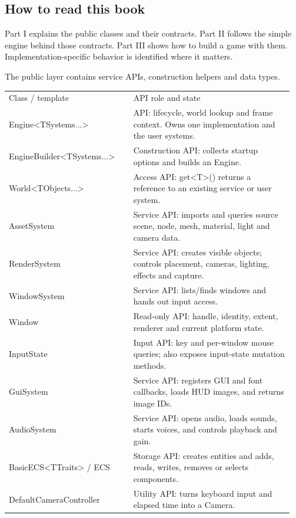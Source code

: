 \documentclass[11pt,a4paper]{article}
\begin{document}
\subsection*{How to read this book}
Part I explains the public classes and their contracts. Part II follows the simple engine behind those contracts. Part III shows how to build a game with them. Implementation-specific behavior is identified where it matters.

\label{core-5}
The public layer contains service APIs, construction helpers and data types.

{\small
\begin{longtable}{@{}p{0.42\linewidth}p{0.54\linewidth}@{}}
Class / template & API role and state \\
Engine<TSystems...> & API: lifecycle, world lookup and frame context. Owns one implementation and the user systems. \\
EngineBuilder<TSystems...> & Construction API: collects startup options and builds an Engine. \\
World<TObjects...> & Access API: get<T>() returns a reference to an existing service or user system. \\
AssetSystem & Service API: imports and queries source scene, node, mesh, material, light and camera data. \\
RenderSystem & Service API: creates visible objects; controls placement, cameras, lighting, effects and capture. \\
WindowSystem & Service API: lists/finds windows and hands out input access. \\
Window & Read-only API: handle, identity, extent, renderer and current platform state. \\
InputState & Input API: key and per-window mouse queries; also exposes input-state mutation methods. \\
GuiSystem & Service API: registers GUI and font callbacks, loads HUD images, and returns image IDs. \\
AudioSystem & Service API: opens audio, loads sounds, starts voices, and controls playback and gain. \\
BasicECS<TTraits> / ECS & Storage API: creates entities and adds, reads, writes, removes or selects components. \\
DefaultCameraController & Utility API: turns keyboard input and elapsed time into a Camera. \\

\end{longtable}}
\end{document}
